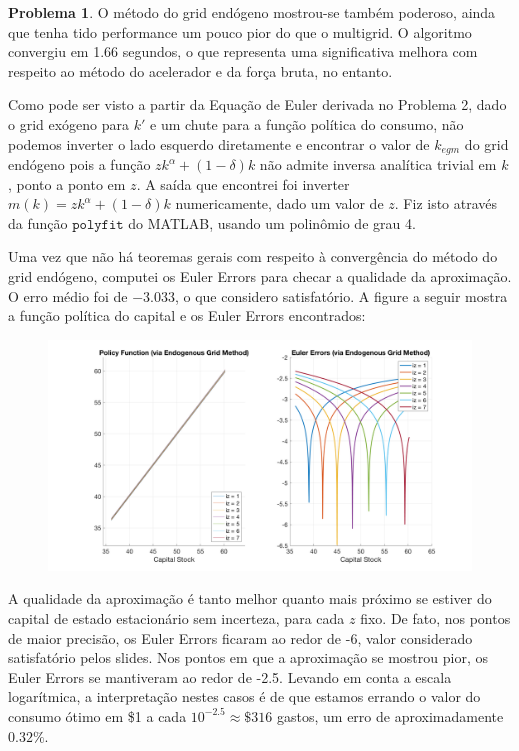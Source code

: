 \documentclass[11pt]{article}
\theoremstyle{definition}
\theoremstyle{definition}
\newtheorem{problema}{Problema}
\theoremstyle{solution}
\begin{document}
\begin{problema}
	O método do grid endógeno mostrou-se também poderoso, ainda que tenha tido performance um pouco pior do que o multigrid. O algoritmo convergiu em 1.66 segundos, o que representa uma significativa melhora com respeito ao método do acelerador e da força bruta, no entanto.
	
	Como pode ser visto a partir da Equação de Euler derivada no Problema 2, dado o grid exógeno para $k'$ e um chute para a função política do consumo, não podemos inverter o lado esquerdo diretamente e encontrar o valor de $k_{egm}$ do grid endógeno pois a função $zk^{\alpha} + (1-\delta)k$ não admite inversa analítica trivial em $k$, ponto a ponto em $z$. A saída que encontrei foi inverter $m(k) =  zk^{\alpha} + (1-\delta)k$ numericamente, dado um valor de $z$. Fiz isto através da função $\texttt{polyfit}$ do MATLAB, usando um polinômio de grau 4.
	
	Uma vez que não há teoremas gerais com respeito à convergência do método do grid endógeno, computei os Euler Errors para checar a qualidade da aproximação. O erro médio foi de $-3.033$, o que considero satisfatório. A figure a seguir mostra a função política do capital e os Euler Errors encontrados:
	\begin{figure}[h!]
		\centering
		\includegraphics[scale = 0.22]{EE.png}
	\end{figure}
	
	A qualidade da aproximação é tanto melhor quanto mais próximo se estiver do capital de estado estacionário sem incerteza, para cada $z$ fixo. De fato, nos pontos de maior precisão, os Euler Errors ficaram ao redor de -6, valor considerado satisfatório pelos slides. Nos pontos em que a aproximação se mostrou pior, os Euler Errors se mantiveram ao redor de -2.5. Levando em conta a escala logarítmica, a interpretação nestes casos é de que estamos errando o valor do consumo ótimo em \$1 a cada $10^{-2.5} \approx \$ 316$ gastos, um erro de aproximadamente $0.32\%$. 
\end{problema}
\end{document}
